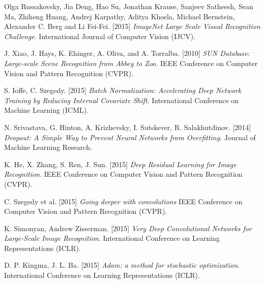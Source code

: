 \begin{thebibliography}{99}

	\bigskip
	
	Olga Russakovsky, Jia Deng, Hao Su, Jonathan Krause, Sanjeev Satheesh, 
	Sean Ma, Zhiheng Huang, Andrej Karpathy, Aditya Khosla, Michael Bernstein, 
	Alexander C. Berg and Li Fei-Fei. [2015]
	\textit{ImageNet Large Scale Visual Recognition Challenge}. 
	International Journal of Computer Vision (IJCV).
	 
	 J. Xiao, J. Hays, K. Ehinger, A. Oliva, and A. Torralba. [2010]
	 \textit{SUN Database: Large-scale Scene Recognition from Abbey to Zoo}.
	 IEEE Conference on Computer Vision and Pattern Recognition (CVPR).
	 
	 S. Ioffe, C. Szegedy. [2015]
	 \textit{Batch Normalization: Accelerating Deep Network Training by 
	 Reducing Internal Covariate Shift}. 
	 International Conference on Machine Learning (ICML).
	 
	 N. Srivastava, G. Hinton, A. Krizhevsky, I. Sutskever, R. Salakhutdinov. [2014]
	 \textit{Dropout: A Simple Way to Prevent Neural Networks from Overfitting}.
	 Journal of Machine Learning Research.
	 
	 K. He, X. Zhang, S. Ren, J. Sun. [2015]
	 \textit{Deep Residual Learning for Image Recognition}.
	 IEEE Conference on Computer Vision and Pattern Recognition (CVPR).
	 
	 C. Szegedy et al. [2015]
	 \textit{Going deeper with convolutions}
	 IEEE Conference on Computer Vision and Pattern Recognition (CVPR).
	 
	 K. Simonyan, Andrew Zisserman. [2015]
	 \textit{Very Deep Convolutional Networks for Large-Scale Image Recognition}.
	 International Conference on Learning Representations (ICLR).
	 
	 D. P. Kingma, J. L. Ba. [2015]
	 \textit{Adam: a method for stochastic optimization}.
	 International Conference on Learning Representations (ICLR).
	 
	 
	
\end{thebibliography}
